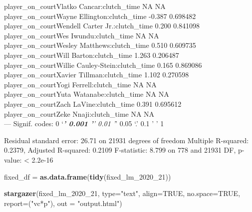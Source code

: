 \documentclass[
  landscape]{article}
\newenvironment{Shaded}{\begin{snugshade}}{\end{snugshade}}
\newcommand{\DataTypeTok}[1]{\textcolor[rgb]{0.13,0.29,0.53}{#1}}
\newcommand{\DecValTok}[1]{\textcolor[rgb]{0.00,0.00,0.81}{#1}}
\newcommand{\KeywordTok}[1]{\textcolor[rgb]{0.13,0.29,0.53}{\textbf{#1}}}
\newcommand{\NormalTok}[1]{#1}
\newcommand{\OtherTok}[1]{\textcolor[rgb]{0.56,0.35,0.01}{#1}}
\newcommand{\StringTok}[1]{\textcolor[rgb]{0.31,0.60,0.02}{#1}}
\begin{document}
player\_on\_courtVlatko Cancar:clutch\_time NA NA\\
player\_on\_courtWayne Ellington:clutch\_time -0.387 0.698482\\
player\_on\_courtWendell Carter Jr.:clutch\_time 0.200 0.841098\\
player\_on\_courtWes Iwundu:clutch\_time NA NA\\
player\_on\_courtWesley Matthews:clutch\_time 0.510 0.609735\\
player\_on\_courtWill Barton:clutch\_time 1.263 0.206487\\
player\_on\_courtWillie Cauley-Stein:clutch\_time 0.165 0.869086\\
player\_on\_courtXavier Tillman:clutch\_time 1.102 0.270598\\
player\_on\_courtYogi Ferrell:clutch\_time NA NA\\
player\_on\_courtYuta Watanabe:clutch\_time NA NA\\
player\_on\_courtZach LaVine:clutch\_time 0.391 0.695612\\
player\_on\_courtZeke Nnaji:clutch\_time NA NA\\
--- Signif. codes: 0 `\emph{\textbf{' 0.001 '}' 0.01 '}' 0.05 `.' 0.1 '
' 1

Residual standard error: 26.71 on 21931 degrees of freedom Multiple
R-squared: 0.2379, Adjusted R-squared: 0.2109 F-statistic: 8.799 on 778
and 21931 DF, p-value: \textless{} 2.2e-16

\begin{Shaded}
\begin{Highlighting}[]
\NormalTok{fixed_df =}\StringTok{ }\KeywordTok{as.data.frame}\NormalTok{(}\KeywordTok{tidy}\NormalTok{(fixed_lm_}\DecValTok{2020}\NormalTok{_}\DecValTok{21}\NormalTok{))}




\KeywordTok{stargazer}\NormalTok{(fixed_lm_}\DecValTok{2020}\NormalTok{_}\DecValTok{21}\NormalTok{,}
          \DataTypeTok{type=}\StringTok{"text"}\NormalTok{,}
          \DataTypeTok{align=}\OtherTok{TRUE}\NormalTok{,}
          \DataTypeTok{no.space=}\OtherTok{TRUE}\NormalTok{,}
          \DataTypeTok{report=}\NormalTok{(}\StringTok{"vc*p"}\NormalTok{),}
          \DataTypeTok{out =} \StringTok{"output.html"}\NormalTok{)}
\end{Highlighting}
\end{Shaded}
\end{document}
